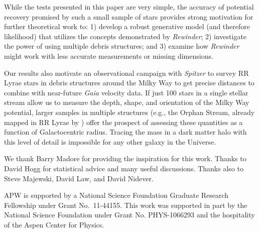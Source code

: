 \documentclass{emulateapj}
\begin{document}
While the tests presented in this paper are very simple, the accuracy of potential recovery promised by such a small sample of stars 
provides strong motivation for further theoretical work to: 1) develop a robust generative model (and therefore likelihood) that utilizes the concepts demonstrated by \emph{Rewinder}; 2) investigate the power of using multiple debris structures; and 3) examine how \emph{Rewinder} might work with less accurate measurements or missing dimensions. 

Our results also motivate an observational campaign with {\it Spitzer} to survey RR Lyrae stars in debris structures around the Milky Way to get precise distances to combine with near-future {\it Gaia} velocity data. 
If just 100 stars in a single stellar stream allow us to measure the depth, shape, and orientation of the Milky Way potential, larger samples in multiple structures (e.g., the Orphan Stream, already mapped in RR Lyrae by \citet{sesar13}) offer the prospect of assessing these quantities as a function of Galactocentric radius. Tracing the mass in a dark matter halo with this level of detail is impossible for any other galaxy in the Universe.

\acknowledgments
We thank Barry Madore for providing the inspiration for this work. Thanks to 
David Hogg for statistical advice and many useful discussions. Thanks also to
Steve Majewski, David Law, and David Nidever.

APW is supported by a National Science Foundation Graduate Research
Fellowship under Grant No.\ 11-44155. This work was supported in part by 
the National Science Foundation under Grant No. PHYS-1066293 and the 
hospitality of the Aspen Center for Physics.


%
\end{document}
